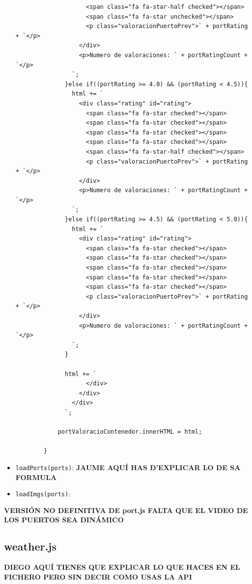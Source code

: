 \documentclass{article}
\begin{document}
\begin{itemize}
\begin{verbatim}
                    <span class="fa fa-star-half checked"></span>
                    <span class="fa fa-star unchecked"></span>
                    <p class="valoracionPuertoPrev">` + portRating + `</p>
                  </div>
                  <p>Numero de valoraciones: ` + portRatingCount + `</p>
                `;
              }else if((portRating >= 4.0) && (portRating < 4.5)){
                html += `
                  <div class="rating" id="rating">
                    <span class="fa fa-star checked"></span>
                    <span class="fa fa-star checked"></span>
                    <span class="fa fa-star checked"></span>
                    <span class="fa fa-star checked"></span>
                    <span class="fa fa-star-half checked"></span>
                    <p class="valoracionPuertoPrev">` + portRating + `</p>
                  </div>
                  <p>Numero de valoraciones: ` + portRatingCount + `</p>
                `;
              }else if((portRating >= 4.5) && (portRating < 5.0)){
                html += `
                  <div class="rating" id="rating">
                    <span class="fa fa-star checked"></span>
                    <span class="fa fa-star checked"></span>
                    <span class="fa fa-star checked"></span>
                    <span class="fa fa-star checked"></span>
                    <span class="fa fa-star checked"></span>
                    <p class="valoracionPuertoPrev">` + portRating + `</p>
                  </div>
                  <p>Numero de valoraciones: ` + portRatingCount + `</p>
                `;
              }
          
              html += `
                    </div>
                  </div>
                </div>
              `;
        
            portValoracioContenedor.innerHTML = html;
        
        }
    \end{verbatim}
    \item \texttt{loadPorts(ports)}: \textbf{JAUME AQUÍ HAS D'EXPLICAR LO DE SA FORMULA}
    \item \texttt{loadImgs(ports)}:
\end{itemize}
\textbf{VERSIÓN NO DEFINITIVA DE port.js FALTA QUE EL VIDEO DE LOS PUERTOS SEA DINÁMICO}
\subsection{weather.js}
\textbf{DIEGO AQUÍ TIENES QUE EXPLICAR LO QUE HACES EN EL FICHERO PERO SIN DECIR COMO USAS LA API}
\end{document}
